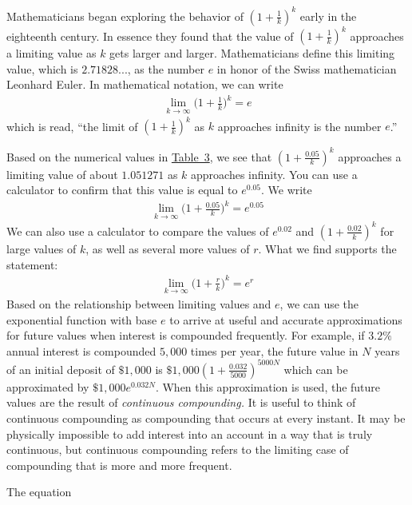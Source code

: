 \documentclass[10pt,]{book}
\theoremstyle{ptxdefinitionnotitle}
\theoremstyle{ptxdefinitiontitle}
\theoremstyle{ptxdefinitionnotitle}
\theoremstyle{ptxdefinitiontitle}
\theoremstyle{ptxdefinitionnotitle}
\theoremstyle{ptxdefinitiontitle}
\numberwithin{equation}{section}
\begin{document}
\hypertarget{p-214}{}%
Mathematicians began exploring the behavior of \((1+\frac{1}{k})^k\) early in the eighteenth century.  In essence they found that the value of \((1+\frac{1}{k})^k\) approaches a limiting value as \(k\) gets larger and larger.  Mathematicians define this limiting value, which is \(2.71828...\), as the number \(e\) in honor of the Swiss mathematician Leonhard Euler.  In mathematical notation, we can write%
%
\begin{gather*}
\lim_{k \to \infty} \bigg(1 + \frac{1}{k}\bigg)^k = e 
\end{gather*}
\hypertarget{p-215}{}%
which is read, “the limit of \((1 + \frac{1}{k})^k\) as \(k\) approaches infinity is the number \(e\).”%
\par
\hypertarget{p-216}{}%
Based on the numerical values in \hyperref[impact-of-k]{Table~3}, we see that \((1 + \frac{0.05}{k})^k\) approaches a limiting value of about \(1.051271\) as \(k\) approaches infinity. You can use a calculator to confirm that this value is equal to \(e^0.05\). We write%
%
\begin{gather*}
\lim_{k \to \infty} \bigg(1 + \frac{0.05}{k}\bigg)^k = e^{0.05}
\end{gather*}
\hypertarget{p-217}{}%
We can also use a calculator to compare the values of \(e^{0.02}\) and \((1 + \frac{0.02}{k})^k\) for large values of \(k\), as well as several more values of \(r\).  What we find supports the statement:%
%
\begin{gather*}
\lim_{k \to \infty} \bigg(1 + \frac{r}{k}\bigg)^k = e^r
\end{gather*}
\hypertarget{p-218}{}%
Based on the relationship between limiting values and \(e\), we can use the exponential function with base \(e\) to arrive at useful and accurate approximations for future values when interest is compounded frequently.  For example, if \(3.2\%\) annual interest is compounded \(5,000\) times per year, the future value in \(N\) years of an initial deposit of \(\$1,000\) is \(\$1,000(1+\frac{0.032}{5000})^{5000N}\) which can be approximated by \(\$1,000e^{0.032N}\).  When this approximation is used, the future values are the result of \emph{continuous compounding.}  It is useful to think of continuous compounding as compounding that occurs at every instant. It may be physically impossible to add interest into an account in a way that is truly continuous, but continuous compounding refers to the limiting case of compounding that is more and more frequent.%
\par
\hypertarget{p-219}{}%
The equation%
\end{document}

